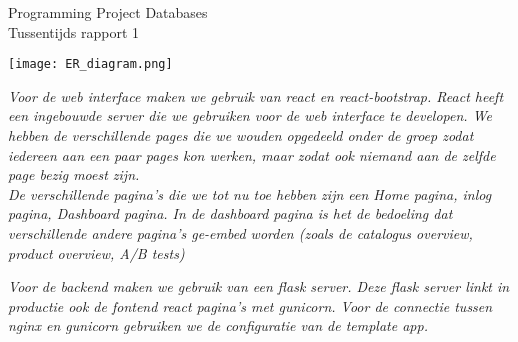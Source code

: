 \documentclass[a4paper]{article}
\newcounter{team}
\begin{document}
	
	\begin{Minutes}{Programming Project Databases \\ Tussentijds rapport 1 }
		\missingNoExcuse{\ldots}
		
		\maketitle
		
		
		
            
                \task*[done]{}
                
                
                
                
            \texttt{[image: ER\_diagram.png]}

		\newpage
		    \emph{Voor de web interface maken we gebruik van react en react-bootstrap. React heeft een ingebouwde server die we gebruiken voor de web interface te developen. We hebben de verschillende pages die we wouden opgedeeld onder de groep zodat iedereen aan een paar pages kon werken, maar zodat ook niemand aan de zelfde page bezig moest zijn. \\
		    
		    De verschillende pagina's die we tot nu toe hebben zijn een Home pagina, inlog pagina, Dashboard pagina. In de dashboard pagina is het de bedoeling dat verschillende andere pagina's ge-embed worden (zoals de catalogus overview, product overview, A/B tests)}
		    
		    \emph{Voor de backend maken we gebruik van een flask server. Deze flask server linkt in productie ook de fontend react pagina's met gunicorn. Voor de connectie tussen nginx en gunicorn gebruiken we de configuratie van de template app.}
		    

\end{Minutes}
\end{document}
